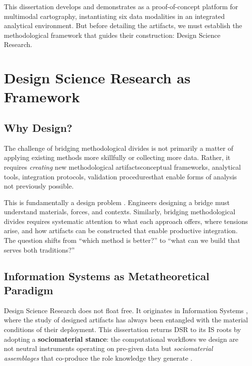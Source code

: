 \documentclass[../main.tex]{subfiles}
\begin{document}
This dissertation develops and demonstrates \RoleBox as a proof-of-concept platform for multimodal cartography, instantiating six data modalities in an integrated analytical environment. But before detailing the artifacts, we must establish the methodological framework that guides their construction: Design Science Research.


\section{Design Science Research as Framework}
\label{sec:intro:dsr}

\subsection{Why Design?}

The challenge of bridging methodological divides is not primarily a matter of applying existing methods more skillfully or collecting more data. Rather, it requires \emph{creating} new methodological artifacts\textemdash conceptual frameworks, analytical tools, integration protocols, validation procedures\textemdash that enable forms of analysis not previously possible.

This is fundamentally a design problem \cite{simon1996sciences}. Engineers designing a bridge must understand materials, forces, and contexts. Similarly, bridging methodological divides requires systematic attention to what each approach offers, where tensions arise, and how artifacts can be constructed that enable productive integration. The question shifts from ``which method is better?'' to ``what can we build that serves both traditions?''

\subsection{Information Systems as Metatheoretical Paradigm}

Design Science Research does not float free. It originates in Information Systems \cite{hevner2004design,peffers2007dsr}, where the study of designed artifacts has always been entangled with the material conditions of their deployment. This dissertation returns DSR to its IS roots by adopting a \textbf{sociomaterial stance}: the computational workflows we design are not neutral instruments operating on pre-given data but \emph{sociomaterial assemblages} that co-produce the role knowledge they generate \cite{Orlikowski2007,orlikowski2008sociomateriality}.
\end{document}
